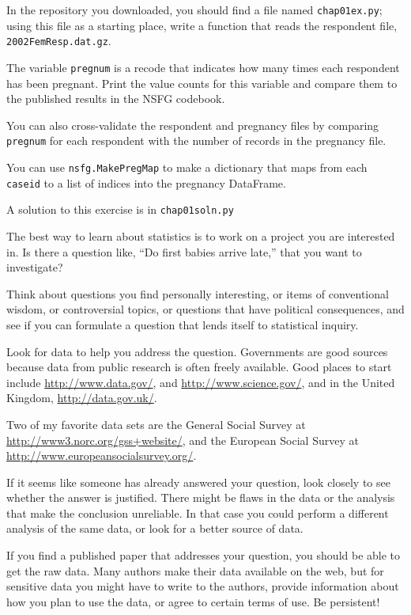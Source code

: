 \documentclass[12pt]{book}
\begin{document}
\begin{exercise}
In the repository you downloaded, you should find a file named
\verb"chap01ex.py"; using this file as a starting place, write a
function that reads the respondent file, \verb"2002FemResp.dat.gz".

The variable \verb"pregnum" is a recode that indicates how many
times each respondent has been pregnant.  Print the value counts
for this variable and compare them to the published results in
the NSFG codebook.

You can also cross-validate the respondent and pregnancy files by
comparing \verb"pregnum" for each respondent with the number of
records in the pregnancy file.

You can use \verb"nsfg.MakePregMap" to make a dictionary that maps
from each \verb"caseid" to a list of indices into the pregnancy
DataFrame.

A solution to this exercise is in \verb"chap01soln.py"
\end{exercise}


\begin{exercise}
The best way to learn about statistics is to work on a project you are
interested in.  Is there a question like, ``Do first babies arrive
late,'' that you want to investigate?

Think about questions you find personally interesting, or items of
conventional wisdom, or controversial topics, or questions that have
political consequences, and see if you can formulate a question that
lends itself to statistical inquiry.

Look for data to help you address the question.  Governments are good
sources because data from public research is often freely
available.  Good places to start include \url{http://www.data.gov/},
and \url{http://www.science.gov/}, and in the United Kingdom,
\url{http://data.gov.uk/}.

Two of my favorite data sets are the General Social Survey at
\url{http://www3.norc.org/gss+website/}, and the European Social
Survey at \url{http://www.europeansocialsurvey.org/}.

If it seems like someone has already answered your question, look
closely to see whether the answer is justified.  There might be flaws
in the data or the analysis that make the conclusion unreliable.  In
that case you could perform a different analysis of the same data, or
look for a better source of data.

If you find a published paper that addresses your question, you
should be able to get the raw data.  Many authors make their data
available on the web, but for sensitive data you might have to
write to the authors, provide information about how you plan to use
the data, or agree to certain terms of use.  Be persistent!

\end{exercise}
\end{document}

